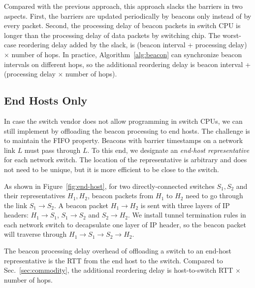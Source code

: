 Compared with the previous approach, this approach slacks the barriers in two aspects. First, the barriers are updated periodically by beacons only instead of by every packet. Second, the processing delay of beacon packets in switch CPU is longer than the processing delay of data packets by switching chip.
The worst-case reordering delay added by the slack, is (beacon interval + processing delay) $\times$ number of hops.
In practice, Algorithm~\ref{alg:beacon} can synchronize beacon intervals on different hops, so the additional reordering delay is beacon interval + (processing delay $\times$ number of hops).

\subsection{End Hosts Only}
\label{sec:end-host}

In case the switch vendor does not allow programming in switch CPUs, we can still implement \sys by offloading the beacon processing to end hosts. The challenge is to maintain the FIFO property. Beacons with barrier timestamps on a network link $L$ must pass through $L$. To this end, we designate an \textit{end-host representative} for each network switch. The location of the representative is arbitrary and does not need to be unique, but it is more efficient to be close to the switch.

As shown in Figure~\ref{fig:end-host}, for two directly-connected switches $S_1, S_2$ and their representatives $H_1, H_2$, beacon packets from $H_1$ to $H_2$ need to go through the link $S_1 \rightarrow S_2$. A beacon packet $H_1 \rightarrow H_2$ is sent with three layers of IP headers: $H_1 \rightarrow S_1$, $S_1 \rightarrow S_2$ and $S_2 \rightarrow H_2$. We install tunnel termination rules in each network switch to decapsulate one layer of IP header, so the beacon packet will traverse through $H_1 \rightarrow S_1 \rightarrow S_2 \rightarrow H_2$.

The beacon processing delay overhead of offloading a switch to an end-host representative is the RTT from the end host to the switch. Compared to Sec.~\ref{sec:commodity}, the additional reordering delay is host-to-switch RTT $\times$ number of hops.
